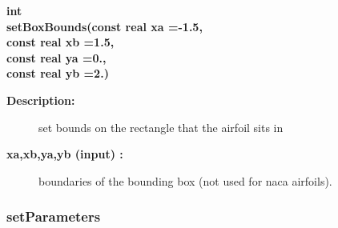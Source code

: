 \begin{flushleft} \textbf{%
int  \\ 
\settowidth{\AirfoilMappingIncludeArgIndent}{setBoxBounds(}%
setBoxBounds(const real xa  =-1.5, \\ 
\hspace{\AirfoilMappingIncludeArgIndent}const real xb  =1.5, \\ 
\hspace{\AirfoilMappingIncludeArgIndent}const real ya  =0., \\ 
\hspace{\AirfoilMappingIncludeArgIndent}const real yb  =2.)
}\end{flushleft}
\begin{description}
\item[{\bf Description:}] 
 set bounds on the rectangle that the airfoil sits in
\item[{\bf xa,xb,ya,yb (input) :}]  boundaries of the bounding box (not used for naca airfoils).
\end{description}
\subsubsection{setParameters}
 
